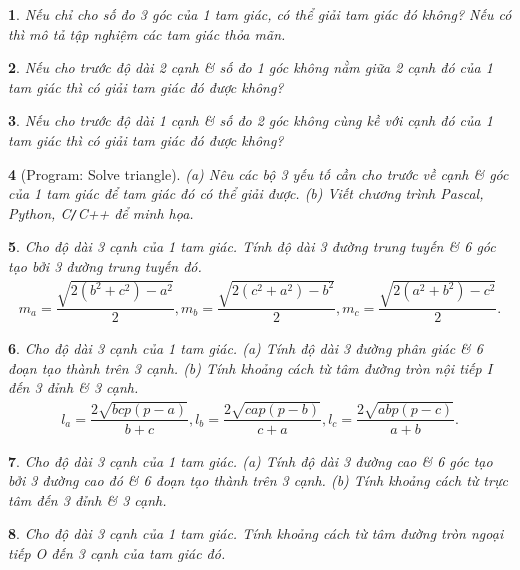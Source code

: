 \documentclass{article}
\newtheorem{baitoan}{}
\begin{document}
\begin{baitoan}
	Nếu chỉ cho số đo 3 góc của 1 tam giác, có thể giải tam giác đó không? Nếu có thì mô tả tập nghiệm các tam giác thỏa mãn.
\end{baitoan}

\begin{baitoan}
	Nếu cho trước độ dài 2 cạnh \& số đo 1 góc không nằm giữa 2 cạnh đó của 1 tam giác thì có giải tam giác đó được không?
\end{baitoan}

\begin{baitoan}
	Nếu cho trước độ dài 1 cạnh \& số đo 2 góc không cùng kề với cạnh đó của 1 tam giác thì có giải tam giác đó được không?
\end{baitoan}

\begin{baitoan}[{\sf Program: Solve triangle}]
	(a) Nêu các bộ 3 yếu tố cần cho trước về cạnh \& góc của 1 tam giác để tam giác đó có thể giải được. (b) Viết chương trình {\sf Pascal, Python, C{\tt/}C++} để minh họa.
\end{baitoan}

\begin{baitoan}
	Cho độ dài 3 cạnh của 1 tam giác. Tính độ dài 3 đường trung tuyến \& 6 góc tạo bởi 3 đường trung tuyến đó.
	\begin{align*}
		m_a = \dfrac{\sqrt{2(b^2 + c^2) - a^2}}{2},m_b = \dfrac{\sqrt{2(c^2 + a^2) - b^2}}{2},m_c = \dfrac{\sqrt{2(a^2 + b^2) - c^2}}{2}.
	\end{align*}
\end{baitoan}

\begin{baitoan}
	Cho độ dài 3 cạnh của 1 tam giác. (a) Tính độ dài 3 đường phân giác \& 6 đoạn tạo thành trên 3 cạnh. (b) Tính khoảng cách từ tâm đường tròn nội tiếp I đến 3 đỉnh \& 3 cạnh.
	\begin{align*}
		l_a = \dfrac{2\sqrt{bcp(p - a)}}{b + c},l_b = \dfrac{2\sqrt{cap(p - b)}}{c + a},l_c = \dfrac{2\sqrt{abp(p - c)}}{a + b}.
	\end{align*}
\end{baitoan}

\begin{baitoan}
	Cho độ dài 3 cạnh của 1 tam giác. (a) Tính độ dài 3 đường cao \& 6 góc tạo bởi 3 đường cao đó \& 6 đoạn tạo thành trên 3 cạnh. (b) Tính khoảng cách từ trực tâm đến 3 đỉnh \& 3 cạnh.
\end{baitoan}

\begin{baitoan}
	Cho độ dài 3 cạnh của 1 tam giác. Tính khoảng cách từ tâm đường tròn ngoại tiếp O đến 3 cạnh của tam giác đó.
\end{baitoan}
\end{document}
